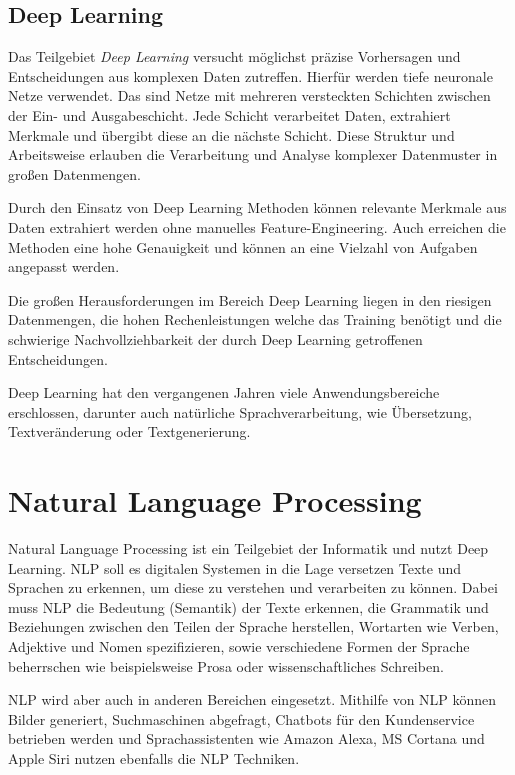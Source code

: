 \subsection{Deep Learning}
Das Teilgebiet \textit{Deep Learning} versucht möglichst präzise Vorhersagen und Entscheidungen aus komplexen Daten zutreffen. Hierfür werden tiefe neuronale Netze verwendet. Das sind Netze mit mehreren versteckten Schichten zwischen der Ein- und Ausgabeschicht. Jede Schicht verarbeitet Daten, extrahiert Merkmale und übergibt diese an die nächste Schicht. Diese Struktur und Arbeitsweise erlauben die Verarbeitung und Analyse komplexer Datenmuster in großen Datenmengen.\vspace{0.2cm}

Durch den Einsatz von Deep Learning Methoden können relevante Merkmale aus Daten extrahiert werden ohne manuelles Feature-Engineering. Auch erreichen die Methoden eine hohe Genauigkeit und können an eine Vielzahl von Aufgaben angepasst werden.\vspace{0.2cm}

Die großen Herausforderungen im Bereich Deep Learning liegen in den riesigen Datenmengen, die hohen Rechenleistungen welche das Training benötigt und die schwierige Nachvollziehbarkeit der durch Deep Learning getroffenen Entscheidungen.\vspace{0.2cm}

Deep Learning hat den vergangenen Jahren viele Anwendungsbereiche erschlossen, darunter auch natürliche Sprachverarbeitung, wie Übersetzung, Textveränderung oder Textgenerierung. 


\section{Natural Language Processing}
Natural Language Processing ist ein Teilgebiet der Informatik und nutzt Deep Learning. NLP soll es digitalen Systemen in die Lage versetzen Texte und Sprachen zu erkennen, um diese zu verstehen und verarbeiten zu können. Dabei muss NLP die Bedeutung (Semantik) der Texte erkennen, die Grammatik und Beziehungen zwischen den Teilen der Sprache herstellen, Wortarten wie Verben, Adjektive und Nomen spezifizieren, sowie verschiedene Formen der Sprache beherrschen wie beispielsweise Prosa oder wissenschaftliches Schreiben.\vspace{0.2cm}

NLP wird aber auch in anderen Bereichen eingesetzt. Mithilfe von NLP können Bilder generiert, Suchmaschinen abgefragt, Chatbots für den Kundenservice betrieben werden und Sprachassistenten wie Amazon Alexa, MS Cortana und Apple Siri nutzen ebenfalls die NLP Techniken.\vspace{0.2cm}

